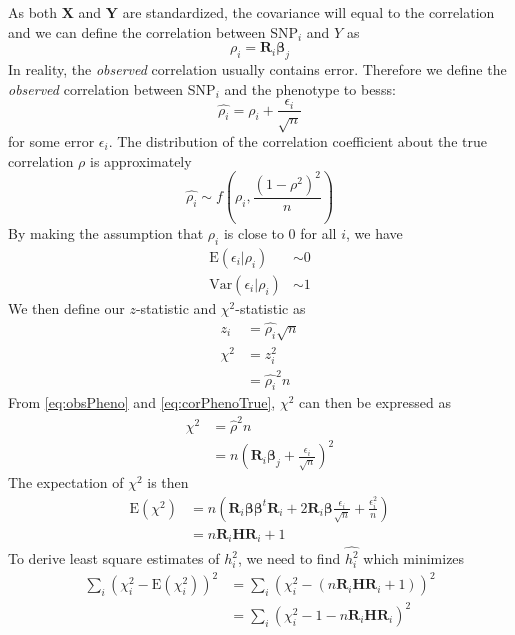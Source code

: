 			As both $\boldsymbol{X}$ and $\boldsymbol{Y}$ are standardized, the covariance will equal to the correlation and we can define the correlation between \gls{SNP}$_i$ and $Y$ as
			\begin{equation}
				\rho_i = \boldsymbol{R}_i\boldsymbol{\beta}_j
				\label{eq:corPhenoTrue}
			\end{equation}
			In reality, the \emph{observed} correlation usually contains error. 
			Therefore we define the \emph{observed} correlation between \gls{SNP}$_i$ and the phenotype to besss:
			\begin{equation}
			\hat{\rho_i} = \rho_i+\frac{\epsilon_i}{\sqrt{n}}
			\label{eq:obsPheno}
			\end{equation}
			for some error $\epsilon_i$. 
			The distribution of the correlation coefficient about the true correlation $\rho$ is approximately
			$$
				\hat{\rho_i}\sim f(\rho_i, \frac{(1-\rho^2)^2}{n})
			$$
			By making the assumption that $\rho_i$ is close to 0 for all $i$, we have 
			\begin{align*}
				\mathrm{E}(\epsilon_i|\rho_i)&\sim 0\\
				\mathrm{Var}(\epsilon_i|\rho_i)&\sim 1
			\end{align*}
			We then define our $z$-statistic and $\chi^2$-statistic as
			\begin{align*}
				z_i &= \hat{\rho_i}\sqrt{n} \\
				\chi^2 &= z_i^2\\
				&=\hat{\rho_i}^2n
			\end{align*}
			From \cref{eq:obsPheno} and \cref{eq:corPhenoTrue}, $\chi^2$ can then be expressed as
			\begin{align*}
			\chi^2&=\hat{\rho}^2n\\
			&=n(\boldsymbol{R}_i\boldsymbol{\beta}_j+\frac{\epsilon_i}{\sqrt{n}})^2
			\end{align*}
			The expectation of $\chi^2$ is then
			\begin{align*}
			\mathrm{E}(\chi^2) &= n(\boldsymbol{R}_i\boldsymbol{\beta\beta}^t\boldsymbol{R}_i+2\boldsymbol{R}_i\boldsymbol{\beta}\frac{\epsilon_i}{\sqrt{n}}+\frac{\epsilon_i^2}{n}) \\
			&= n\boldsymbol{R}_i\boldsymbol{H}\boldsymbol{R}_i+1
			\end{align*}
			To derive least square estimates of $h_i^2$, we need to find $\hat{h_i^2}$ which minimizes
			\begin{align*}
				\sum_i(\chi_i^2-\mathrm{E}(\chi_i^2))^2&=\sum_i(\chi_i^2-(n\boldsymbol{R}_i\boldsymbol{H}\boldsymbol{R}_i+1))^2 \\
				&=\sum_i(\chi_i^2-1-n\boldsymbol{R}_i\boldsymbol{H}\boldsymbol{R}_i)^2 
			\end{align*}
